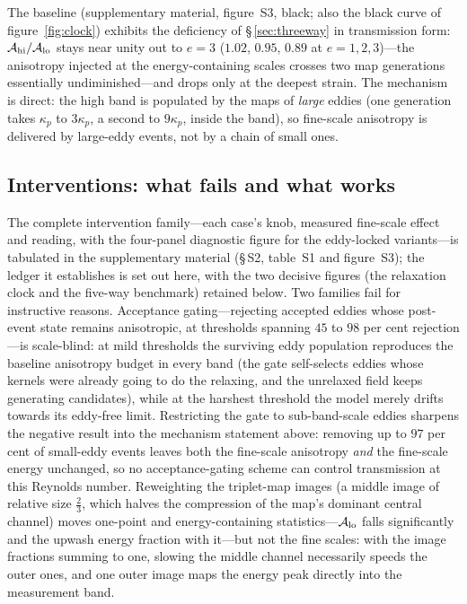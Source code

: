 \documentclass[11pt,a4paper]{article}
\begin{document}
The baseline (supplementary material, figure~S3, black; also the black
curve of figure~\ref{fig:clock}) exhibits the deficiency of
\S\,\ref{sec:threeway} in transmission form:
$\mathcal A_{\rm hi}/\mathcal A_{\rm lo}$ stays near unity out to $e=3$
($1.02$, $0.95$, $0.89$ at $e=1,2,3$)---the anisotropy injected at the
energy-containing scales crosses two map generations essentially
undiminished---and drops only at the deepest strain. The mechanism is
direct: the high band is populated by the maps of \emph{large} eddies
(one generation takes $\kappa_p$ to $3\kappa_p$, a second to $9\kappa_p$,
inside the band), so fine-scale anisotropy is delivered by large-eddy
events, not by a chain of small ones.

\subsection{Interventions: what fails and what works}\label{sec:interventions}

The complete intervention family---each case's knob, measured
fine-scale effect and reading, with the four-panel diagnostic figure
for the eddy-locked variants---is tabulated in the supplementary
material (\S\,S2, table~S1 and figure~S3); the ledger it establishes
is set out here, with the two decisive figures (the relaxation clock
and the five-way benchmark) retained below. Two
families fail for instructive reasons. Acceptance gating---rejecting
accepted eddies whose post-event state remains anisotropic, at thresholds
spanning $45$ to $98$ per cent rejection---is scale-blind: at mild
thresholds the surviving eddy population reproduces the baseline
anisotropy budget in every band (the gate self-selects eddies whose
kernels were already going to do the relaxing, and the unrelaxed field
keeps generating candidates), while at the harshest threshold the model
merely drifts towards its eddy-free limit. Restricting the gate to
sub-band-scale eddies sharpens the negative result into the mechanism
statement above: removing up to $97$ per cent of small-eddy events leaves
both the fine-scale anisotropy \emph{and} the fine-scale energy
unchanged, so no acceptance-gating scheme can control transmission at
this Reynolds number. Reweighting the triplet-map images (a middle image
of relative size $\tfrac23$, which halves the compression of the
map's dominant central channel) moves one-point and energy-containing
statistics---$\mathcal A_{\rm lo}$ falls significantly and the upwash
energy fraction with it---but not the fine scales: with the image
fractions summing to one, slowing the middle channel necessarily speeds
the outer ones, and one outer image maps the energy peak directly into
the measurement band.
\end{document}
